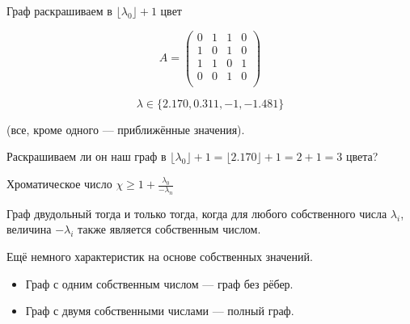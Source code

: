 \begin{theorem}
Граф раскрашиваем в $\lfloor \lambda_0\rfloor + 1$ цвет
\end{theorem}

\begin{example}
$$ A =
  \left({
  \begin{array}{rrrrrr}
  0 & 1 & 1 & 0 \\
  1 & 0 & 1 & 0 \\
  1 & 1 & 0 & 1 \\
  0 & 0 & 1 & 0 \\
  \end{array}
  }\right)
$$

$$\lambda \in \{2.170,0.311,-1,-1.481\}$$

(все, кроме одного --- приближённые значения).

Раскрашиваем ли он наш граф в $\lfloor \lambda_0\rfloor + 1 = \lfloor 2.170 \rfloor + 1 = 2 + 1 = 3$ цвета? 
\end{example}

\begin{theorem}
Хроматическое число $\chi \geq 1 + \frac{\lambda_0}{-\lambda_n}$
\end{theorem}


\begin{theorem}
Граф двудольный тогда и только тогда, когда для любого собственного числа $\lambda_i$, величина $-\lambda_i$ 
также является собственным числом.
\end{theorem}


\begin{theorem}
Ещё немного характеристик на основе собственных значений.
\begin{itemize}
  \item Граф с одним собственным числом --- граф без рёбер.
  \item Граф с двумя собственными числами --- полный граф.
\end{itemize}
\end{theorem}


